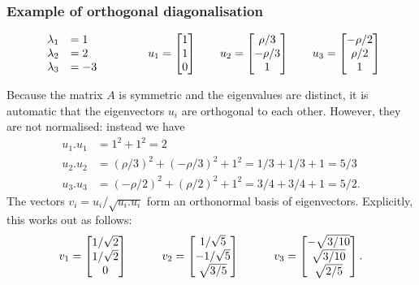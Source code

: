 \documentclass[9pt]{beamer}
\begin{document}
\begin{frame}[t]
 \frametitle{Example of orthogonal diagonalisation}
 \vspace{-5ex}
 \[
    \begin{array}{rl}
     \lambda_1 &= 1 \\
     \lambda_2 &= 2 \\
     \lambda_3 &= -3
    \end{array}
    \hspace{4em}
    u_1 = \left[\begin{matrix} 1\\1\\0\end{matrix}\right] \qquad
    u_2 = \left[\begin{matrix} \rho/3 \\ -\rho/3\\ 1\end{matrix}\right] \qquad
    u_3 = \left[\begin{matrix} -\rho/2\\ \rho/2 \\ 1 \end{matrix}\right]
 \]
 \reminderbar
 
 Because the matrix $A$ is symmetric and the eigenvalues are distinct,
 it is automatic that the eigenvectors $u_i$ are orthogonal to each
 other.  However, they are not normalised: instead we have
 \begin{align*}
    u_1.u_1 &= 1^2+1^2 = 2 \\
    u_2.u_2 &= (\rho/3)^2 + (-\rho/3)^2 + 1^2 
             = 1/3 + 1/3 + 1 = 5/3 \\
    u_3.u_3 &= (-\rho/2)^2 + (\rho/2)^2 + 1^2
             = 3/4 + 3/4 + 1 = 5/2.
 \end{align*}
 The vectors $v_i=u_i/\sqrt{u_i.u_i}$ form an orthonormal basis of
 eigenvectors.  Explicitly, this works out as follows:
 \[ 
   v_1 = \left[\begin{matrix} 1/\sqrt{2} \\ 1/\sqrt{2} \\ 0 \end{matrix}\right]
   \hspace{3em}
   v_2 = \left[\begin{matrix} 1/\sqrt{5} \\ -1/\sqrt{5} \\ \sqrt{3/5} \end{matrix}\right]
   \hspace{3em}
   v_3 = \left[\begin{matrix} -\sqrt{3/10} \\ \sqrt{3/10} \\ \sqrt{2/5} \end{matrix}\right].
 \]
\end{frame}
\end{document}
